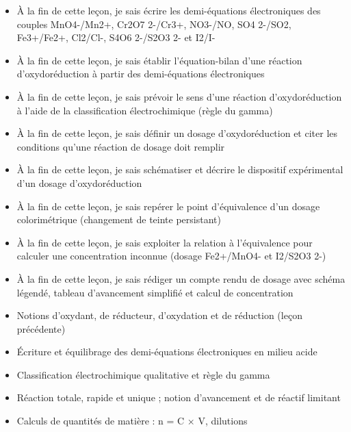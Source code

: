 \documentclass[11pt]{article}
\begin{document}
\begin{objectifs}
\begin{itemize}
\item À la fin de cette leçon, je sais écrire les demi-équations électroniques des couples MnO4-/Mn2+, Cr2O7 2-/Cr3+, NO3-/NO, SO4 2-/SO2, Fe3+/Fe2+, Cl2/Cl-, S4O6 2-/S2O3 2- et I2/I-
\item À la fin de cette leçon, je sais établir l'équation-bilan d'une réaction d'oxydoréduction à partir des demi-équations électroniques
\item À la fin de cette leçon, je sais prévoir le sens d'une réaction d'oxydoréduction à l'aide de la classification électrochimique (règle du gamma)
\item À la fin de cette leçon, je sais définir un dosage d'oxydoréduction et citer les conditions qu'une réaction de dosage doit remplir
\item À la fin de cette leçon, je sais schématiser et décrire le dispositif expérimental d'un dosage d'oxydoréduction
\item À la fin de cette leçon, je sais repérer le point d'équivalence d'un dosage colorimétrique (changement de teinte persistant)
\item À la fin de cette leçon, je sais exploiter la relation à l'équivalence pour calculer une concentration inconnue (dosage Fe2+/MnO4- et I2/S2O3 2-)
\item À la fin de cette leçon, je sais rédiger un compte rendu de dosage avec schéma légendé, tableau d'avancement simplifié et calcul de concentration
\end{itemize}
\end{objectifs}

\begin{prerequis}
\begin{itemize}
\item Notions d'oxydant, de réducteur, d'oxydation et de réduction (leçon précédente)
\item Écriture et équilibrage des demi-équations électroniques en milieu acide
\item Classification électrochimique qualitative et règle du gamma
\item Réaction totale, rapide et unique ; notion d'avancement et de réactif limitant
\item Calculs de quantités de matière : n = C × V, dilutions
\end{itemize}
\end{prerequis}

\newpage
\end{document}
